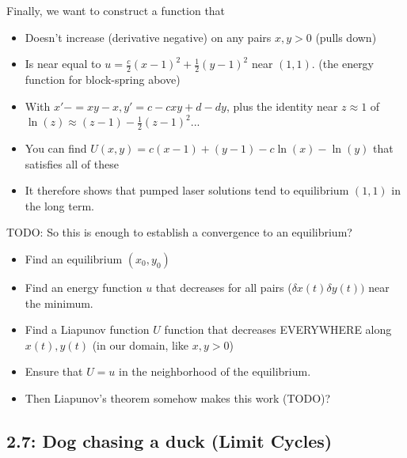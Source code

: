 \documentclass[11pt, oneside]{article}   	%
\begin{document}
\begin{itemize}
Finally, we want to construct a function that
\begin{itemize}
\item Doesn't increase (derivative negative) on any pairs $x, y > 0$ (pulls down)
\item Is near equal to  $u = \frac{c}{2}(x-1)^2 + \frac{1}{2}(y-1)^2$ near $(1,1)$. (the energy function for block-spring above)
\item With $x' -= xy-x, y'=c-cxy + d-dy$, plus the identity near $z \approx 1$ of $\ln(z) \approx (z-1)-\frac{1}{2}(z-1)^2$...
\item You can find $U(x,y) = c(x-1)+(y-1) -c\ln(x)-\ln(y)$ that satisfies all of these
\item It therefore shows that pumped laser solutions tend to equilibrium $(1,1)$ in the long term.
\end{itemize}

TODO: So this is enough to establish a convergence to an equilibrium?
\begin{itemize}
\item Find an equilibrium $(x_0, y_0)$
\item Find an energy function $u$ that decreases for all pairs ($\delta x(t) \delta y(t))$ near the minimum.
\item Find a Liapunov function $U$ function that decreases EVERYWHERE along $x(t), y(t)$ (in our domain, like $x,y > 0$)
\item Ensure that $U = u$ in the neighborhood of the equilibrium.
\item Then Liapunov's theorem somehow makes this work (TODO)?
\end{itemize}

\end{itemize}

\subsection{2.7: Dog chasing a duck (Limit Cycles)}
\end{document}
